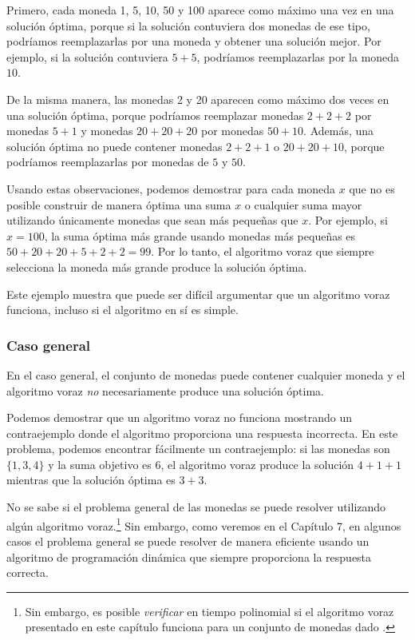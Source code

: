 Primero, cada moneda 1, 5, 10, 50 y 100 aparece
como máximo una vez en una solución óptima,
porque si la solución contuviera dos monedas de ese tipo,
podríamos reemplazarlas por una moneda y
obtener una solución mejor.
Por ejemplo, si la solución contuviera
$5+5$, podríamos reemplazarlas por la moneda $10$.

De la misma manera, las monedas 2 y 20 aparecen
como máximo dos veces en una solución óptima,
porque podríamos reemplazar
monedas $2+2+2$ por monedas $5+1$ y
monedas $20+20+20$ por monedas $50+10$.
Además, una solución óptima no puede contener
monedas $2+2+1$ o $20+20+10$,
porque podríamos reemplazarlas por monedas de $5$ y $50$.

Usando estas observaciones,
podemos demostrar para cada moneda $x$ que
no es posible construir de manera óptima
una suma $x$ o cualquier suma mayor utilizando únicamente monedas
que sean más pequeñas que $x$.
Por ejemplo, si $x=100$, la suma óptima más grande
usando monedas más pequeñas es $50+20+20+5+2+2=99$.
Por lo tanto, el algoritmo voraz que siempre selecciona
la moneda más grande produce la solución óptima.

Este ejemplo muestra que puede ser difícil
argumentar que un algoritmo voraz funciona,
incluso si el algoritmo en sí es simple.

\subsubsection{Caso general}

En el caso general, el conjunto de monedas puede contener cualquier moneda
y el algoritmo voraz \emph{no} necesariamente produce
una solución óptima.

Podemos demostrar que un algoritmo voraz no funciona
mostrando un contraejemplo
donde el algoritmo proporciona una respuesta incorrecta.
En este problema, podemos encontrar fácilmente un contraejemplo:
si las monedas son $\{1,3,4\}$ y la suma objetivo
es 6, el algoritmo voraz produce la solución
$4+1+1$ mientras que la solución óptima es $3+3$.

No se sabe si el problema general de las monedas
se puede resolver utilizando algún algoritmo voraz.\footnote{Sin embargo, es posible
    \emph{verificar} en tiempo polinomial
    si el algoritmo voraz presentado en este capítulo funciona para
    un conjunto de monedas dado \cite{pea05}.}
Sin embargo, como veremos en el Capítulo 7,
en algunos casos
el problema general se puede resolver de manera eficiente
usando un algoritmo de programación dinámica que siempre proporciona la
respuesta correcta.

